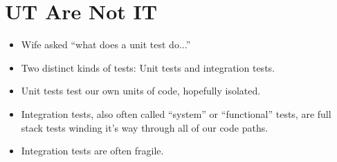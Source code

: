 \documentclass{article}
\begin{document}
\sloppy
\section{UT Are Not IT}
\begin{itemize}
    \item Wife asked ``what does a unit test do...''
    \item Two distinct kinds of tests: Unit tests and integration tests.
    \item Unit tests test our own units of code, hopefully isolated.
    \item Integration tests, also often called ``system'' or ``functional''
        tests, are full stack tests winding it's way through all of our code
        paths.
    \item Integration tests are often fragile.
\end{itemize}
\end{document}
